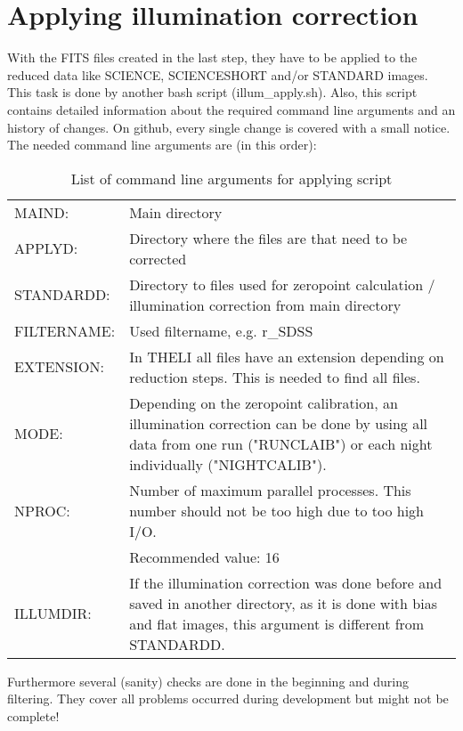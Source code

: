 \section{Applying illumination correction}
\label{sec:ApplyingIlluminationCorrection}
With the FITS files created in the last step, they have to be applied to the reduced data like SCIENCE, SCIENCESHORT and/or STANDARD images. This task is done by another bash script (illum\_apply.sh). Also, this script contains detailed information about the required command line arguments and an history of changes. On github, every single change is covered with a small notice. The needed command line arguments are (in this order):
\begin{table}[H]
\centering
\begin{tabular}{lp{11.5cm}}
MAIND: & Main directory\\
APPLYD: & Directory where the files are that need to be corrected\\
STANDARDD: & Directory to files used for zeropoint calculation / illumination correction from main directory\\
FILTERNAME: & Used filtername, e.g. r\_SDSS\\
EXTENSION: & In \textrm{THELI} all files have an extension depending on reduction steps. This is needed to find all files.\\
MODE: & Depending on the zeropoint calibration, an illumination correction can be done by using all data from one run ("RUNCLAIB") or each night individually ("NIGHTCALIB").\\
NPROC: & Number of maximum parallel processes. This number should not be too high due to too high I/O.\\
 & Recommended value: 16\\
ILLUMDIR: & If the illumination correction was done before and saved in another directory, as it is done with bias and flat images, this argument is different from STANDARDD.
\end{tabular}
\caption{List of command line arguments for applying script}
\label{tab:CommandLineArgumentsApplyingScript}
\end{table}
Furthermore several (sanity) checks are done in the beginning and during filtering. They cover all problems occurred during development but might not be complete!
